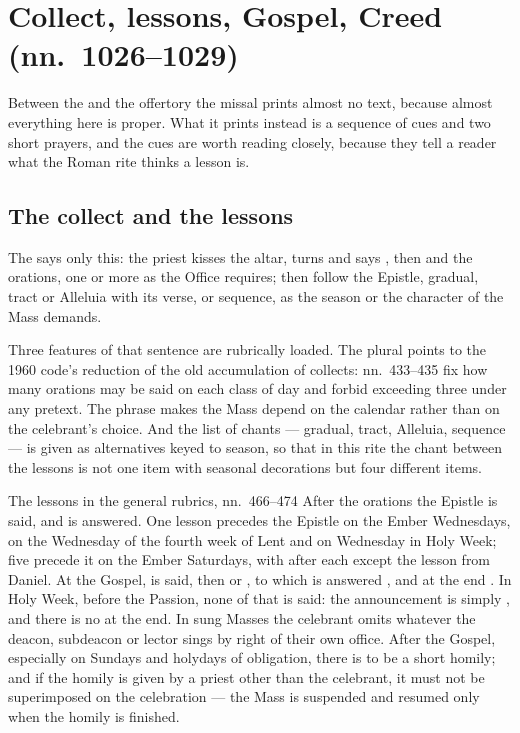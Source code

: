 \section{Collect, lessons, Gospel, Creed (nn.~1026--1029)}

Between the  and the offertory the missal prints almost no
text, because almost everything here is proper. What it prints instead is a
sequence of cues and two short prayers, and the cues are worth reading closely,
because they tell a reader what the Roman rite thinks a lesson is.

\subsection*{The collect and the lessons}

The  says only this: the priest kisses the altar, turns and
says , then  and the orations, one
or more as the Office requires; then follow the Epistle, gradual, tract or
Alleluia with its verse, or sequence, as the season or the character of the
Mass demands.

Three features of that sentence are rubrically loaded. The plural
 points to the 1960 code's reduction of
the old accumulation of collects: nn.~433--435 fix how many orations may be
said on each class of day and forbid exceeding three under any pretext. The
phrase  makes the Mass depend on the
calendar rather than on the celebrant's choice. And the list of chants ---
gradual, tract, Alleluia, sequence --- is given as alternatives keyed to
season, so that in this rite the chant between the lessons is not one item with
seasonal decorations but four different items.

\begin{rubricnote}{The lessons in the general rubrics, nn.~466--474}
After the orations the Epistle is said, and  is answered.
One lesson precedes the Epistle on the Ember Wednesdays, on the Wednesday of
the fourth week of Lent and on Wednesday in Holy Week; five precede it on the
Ember Saturdays, with  after each except the lesson from
Daniel. At the Gospel,  is said, then
 or , to
which is answered , and at the end . In Holy Week, before the Passion, none of that is said: the
announcement is simply , and there is no  at the end. In sung Masses
the celebrant omits whatever the deacon, subdeacon or lector sings by right of
their own office. After the Gospel, especially on Sundays and holydays of
obligation, there is to be a short homily; and if the homily is given by a
priest other than the celebrant, it must not be superimposed on the celebration
--- the Mass is suspended and resumed only when the homily is finished.
\end{rubricnote}

